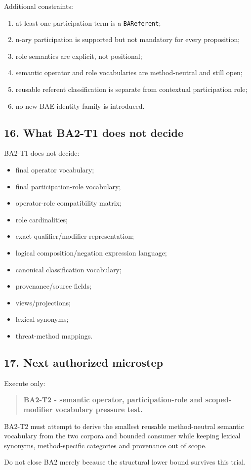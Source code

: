 \documentclass[
  10pt,
  letterpaper,
]{article}
\providecommand{\tightlist}{%
  \setlength{\itemsep}{0pt}\setlength{\parskip}{0pt}}
\begin{document}
Additional constraints:

\begin{enumerate}
\def\labelenumi{\arabic{enumi}.}
\tightlist
\item
  at least one participation term is a \texttt{BAReferent};
\item
  n-ary participation is supported but not mandatory for every
  proposition;
\item
  role semantics are explicit, not positional;
\item
  semantic operator and role vocabularies are method-neutral and still
  open;
\item
  reusable referent classification is separate from contextual
  participation role;
\item
  no new BAE identity family is introduced.
\end{enumerate}

\subsection{16. What BA2-T1 does not
decide}\label{what-ba2-t1-does-not-decide}

BA2-T1 does not decide:

\begin{itemize}
\tightlist
\item
  final operator vocabulary;
\item
  final participation-role vocabulary;
\item
  operator-role compatibility matrix;
\item
  role cardinalities;
\item
  exact qualifier/modifier representation;
\item
  logical composition/negation expression language;
\item
  canonical classification vocabulary;
\item
  provenance/source fields;
\item
  views/projections;
\item
  lexical synonyms;
\item
  threat-method mappings.
\end{itemize}

\subsection{17. Next authorized
microstep}\label{next-authorized-microstep}

Execute only:

\begin{quote}
\textbf{BA2-T2 - semantic operator, participation-role and
scoped-modifier vocabulary pressure test.}
\end{quote}

BA2-T2 must attempt to derive the smallest reusable method-neutral
semantic vocabulary from the two corpora and bounded consumer while
keeping lexical synonyms, method-specific categories and provenance out
of scope.

Do not close BA2 merely because the structural lower bound survives this
trial.
\end{document}
